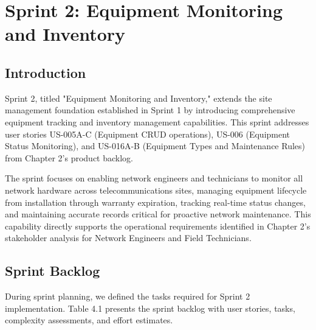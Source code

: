 \newpage

\chapter{Sprint 2: Equipment Monitoring and Inventory}

\cfoot{\thepage}

\parindent=0.5in
\onehalfspacing

\section{Introduction}

Sprint 2, titled "Equipment Monitoring and Inventory," extends the site management foundation established in Sprint 1 by introducing comprehensive equipment tracking and inventory management capabilities. This sprint addresses user stories US-005A-C (Equipment CRUD operations), US-006 (Equipment Status Monitoring), and US-016A-B (Equipment Types and Maintenance Rules) from Chapter 2's product backlog.

The sprint focuses on enabling network engineers and technicians to monitor all network hardware across telecommunications sites, managing equipment lifecycle from installation through warranty expiration, tracking real-time status changes, and maintaining accurate records critical for proactive network maintenance. This capability directly supports the operational requirements identified in Chapter 2's stakeholder analysis for Network Engineers and Field Technicians.

\section{Sprint Backlog}

During sprint planning, we defined the tasks required for Sprint 2 implementation. Table 4.1 presents the sprint backlog with user stories, tasks, complexity assessments, and effort estimates.

